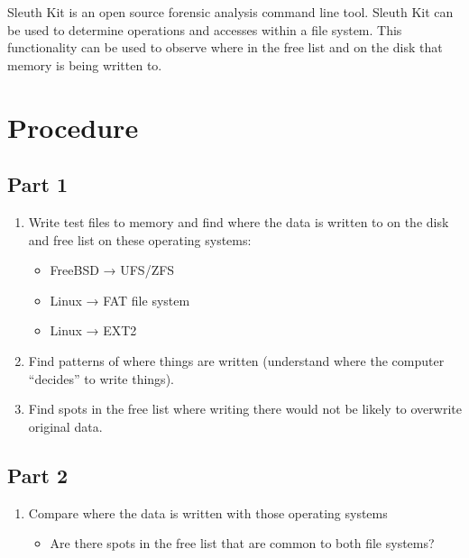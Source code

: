 \documentclass[a4paper]{article}
\begin{document}
Sleuth Kit is an open source forensic analysis command line tool. Sleuth Kit can be used to determine operations and accesses within a file system. This functionality can be used to observe where in the free list and on the disk that memory is being written to. 

\section{Procedure}
\subsection{Part 1}
\begin{enumerate}
\item Write test files to memory and find where the data is written to on the disk and free list on these operating systems:\\
\begin{itemize}
\item FreeBSD → UFS/ZFS
\item Linux → FAT file system
\item Linux → EXT2
\end{itemize}
\item Find patterns of where things are written (understand where the computer “decides” to write things).
\item Find spots in the free list where writing there would not be likely to overwrite original data.
\end{enumerate}
\subsection{Part 2}
\begin{enumerate}
\item Compare where the data is written with those operating systems
\begin{itemize}
\item Are there spots in the free list that are common to both file systems?
\end{itemize}
\end{enumerate}
\end{document}

